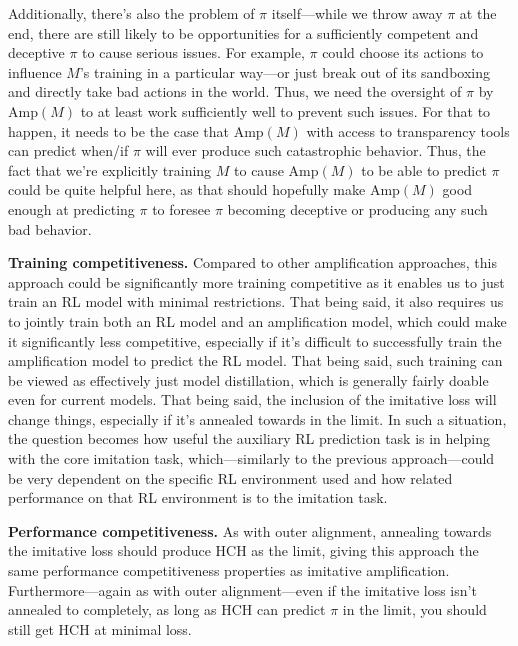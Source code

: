 \documentclass[
  onecolumn,
  natbib,
]{miri-tech-article}
\begin{document}
Additionally, there's also the problem of $\pi$ itself---while we throw away $\pi$ at the end, there are still likely to be opportunities for a sufficiently competent and deceptive $\pi$ to cause serious issues. For example, $\pi$ could choose its actions to influence $M$'s training in a particular way---or just break out of its sandboxing and directly take bad actions in the world. Thus, we need the oversight of $\pi$ by $\text{Amp}(M)$ to at least work sufficiently well to prevent such issues. For that to happen, it needs to be the case that $\text{Amp}(M)$ with access to transparency tools can predict when/if $\pi$ will ever produce such catastrophic behavior. Thus, the fact that we're explicitly training $M$ to cause $\text{Amp}(M)$ to be able to predict $\pi$ could be quite helpful here, as that should hopefully make $\text{Amp}(M)$ good enough at predicting $\pi$ to foresee $\pi$ becoming deceptive or producing any such bad behavior.

\textbf{Training competitiveness.} Compared to other amplification approaches, this approach could be significantly more training competitive as it enables us to just train an RL model with minimal restrictions. That being said, it also requires us to jointly train both an RL model and an amplification model, which could make it significantly less competitive, especially if it's difficult to successfully train the amplification model to predict the RL model. That being said, such training can be viewed as effectively just model distillation, which is generally fairly doable even for current models. That being said, the inclusion of the imitative loss will change things, especially if it's annealed towards in the limit. In such a situation, the question becomes how useful the auxiliary RL prediction task is in helping with the core imitation task, which---similarly to the previous approach---could be very dependent on the specific RL environment used and how related performance on that RL environment is to the imitation task.

\textbf{Performance competitiveness.} As with outer alignment, annealing towards the imitative loss should produce HCH as the limit, giving this approach the same performance competitiveness properties as imitative amplification. Furthermore---again as with outer alignment---even if the imitative loss isn't annealed to completely, as long as HCH can predict $\pi$ in the limit, you should still get HCH at minimal loss.


\end{document}
